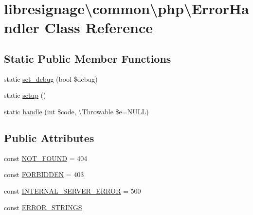 \hypertarget{classlibresignage_1_1common_1_1php_1_1ErrorHandler}{}\section{libresignage\textbackslash{}common\textbackslash{}php\textbackslash{}Error\+Handler Class Reference}
\label{classlibresignage_1_1common_1_1php_1_1ErrorHandler}
\subsection*{Static Public Member Functions}
\begin{DoxyCompactItemize}
\item 
static \hyperlink{classlibresignage_1_1common_1_1php_1_1ErrorHandler_ae28265e454a8a9137e1971a14242c1b0}{set\+\_\+debug} (bool \$debug)
\item 
static \hyperlink{classlibresignage_1_1common_1_1php_1_1ErrorHandler_ab190662494c323e5ba7c7d9953b4127b}{setup} ()
\item 
static \hyperlink{classlibresignage_1_1common_1_1php_1_1ErrorHandler_ad0b9b209b9050178ca7fb80940d086bd}{handle} (int \$code, \textbackslash{}Throwable \$e=N\+U\+LL)
\end{DoxyCompactItemize}
\subsection*{Public Attributes}
\begin{DoxyCompactItemize}
\item 
const \hyperlink{classlibresignage_1_1common_1_1php_1_1ErrorHandler_a4c0a076d9365e17271df419a5a821221}{N\+O\+T\+\_\+\+F\+O\+U\+ND} = 404
\item 
const \hyperlink{classlibresignage_1_1common_1_1php_1_1ErrorHandler_af0646311186ddbe7d2b5944c37b84bc1}{F\+O\+R\+B\+I\+D\+D\+EN} = 403
\item 
const \hyperlink{classlibresignage_1_1common_1_1php_1_1ErrorHandler_a0ce95528b49d64764d9525e041458378}{I\+N\+T\+E\+R\+N\+A\+L\+\_\+\+S\+E\+R\+V\+E\+R\+\_\+\+E\+R\+R\+OR} = 500
\item 
const \hyperlink{classlibresignage_1_1common_1_1php_1_1ErrorHandler_a4116c0eb668b7f2d2564f3fde2b36424}{E\+R\+R\+O\+R\+\_\+\+S\+T\+R\+I\+N\+GS}
\end{DoxyCompactItemize}


